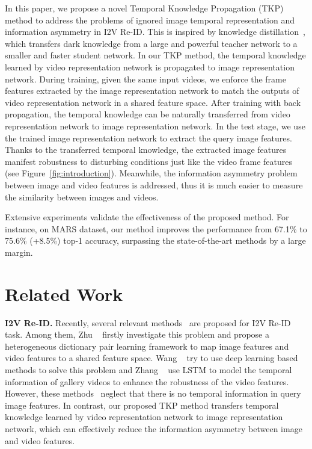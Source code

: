 \documentclass[10pt,twocolumn,letterpaper]{article}
\begin{document}
In this paper, we propose a novel Temporal Knowledge Propagation (TKP) method to address the problems of ignored image temporal representation and information asymmetry in I2V Re-ID.
This is inspired by knowledge distillation~\cite{Hinton2015Distilling}, which transfers dark knowledge from a large and powerful teacher network to a smaller and faster student network.
In our TKP method, the temporal knowledge learned by video representation network is propagated to image representation network.
During training, given the same input videos, we enforce the frame features extracted by the image representation network to match the outputs of video representation network in a shared feature space.
After training with back propagation, the temporal knowledge can be naturally transferred from video representation network to image representation network.
In the test stage, we use the trained image representation network to extract the query image features.
Thanks to the transferred temporal knowledge, the extracted image features manifest robustness to disturbing conditions just like the video frame features (see Figure~\ref{fig:introduction}).
Meanwhile, the information asymmetry problem between image and video features is addressed, thus it is much easier to measure the similarity between images and videos.

Extensive experiments validate the effectiveness of the proposed method.
For instance, on MARS dataset, our method improves the performance from 67.1\% to 75.6\% (+8.5\%) \wrt top-1 accuracy, surpassing the state-of-the-art methods by a large margin.

\section{Related Work}

\noindent
{\bf I2V Re-ID.}
Recently, several relevant methods~\cite{Wang2017P2SNet,Zhang2017Image,Zhu2017Learning,Zhu2018Image} are proposed for I2V Re-ID task.
Among them, Zhu \etal~\cite{Zhu2017Learning,Zhu2018Image} firstly investigate this problem and propose a heterogeneous dictionary pair learning framework to map image features and video features to a shared feature space.
Wang \etal~\cite{Wang2017P2SNet} try to use deep learning based methods to solve this problem and Zhang \etal~\cite{Zhang2017Image} use LSTM to model the temporal information of gallery videos to enhance the robustness of the video features.
However, these methods~\cite{Zhu2017Learning, Zhu2018Image,Zhang2017Image} neglect that there is no temporal information in query image features.
In contrast, our proposed TKP method transfers temporal knowledge learned by video representation network to image representation network, which can effectively reduce the information asymmetry between image and video features.
\end{document}
